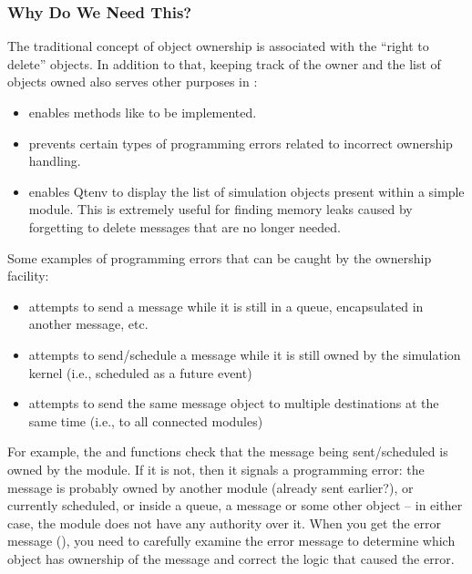 \subsubsection{Why Do We Need This?}
\label{sec:sim-lib:why-we-need-ownership}

The traditional concept of object ownership is associated with
the ``right to delete'' objects. In addition to that,
keeping track of the owner and the list of objects owned also
serves other purposes in {\opp}:

\begin{itemize}
    \item enables methods like  to be implemented.

    \item prevents certain types of programming errors related to incorrect
    ownership handling.

    \item enables Qtenv to display the list of simulation objects
    present within a simple module. This is extremely useful for finding
    memory leaks caused by forgetting to delete messages that are
    no longer needed.
\end{itemize}

Some examples of programming errors that can be caught
by the ownership facility:

\begin{itemize}
    \item attempts to send a message while it is still in a queue,
    encapsulated in another message, etc.

    \item attempts to send/schedule a message while it is still owned
    by the simulation kernel (i.e., scheduled as a future event)

    \item attempts to send the same message object to multiple
    destinations at the same time (i.e., to all connected modules)
\end{itemize}

For example, the  and  functions check
that the message being sent/scheduled is owned by the module.
If it is not, then it signals a programming error: the message is probably
owned by another module (already sent earlier?), or currently scheduled, or
inside a queue, a message or some other object -- in either case, the
module does not have any authority over it. When you get the error message
(), you need to carefully examine the error
message to determine which object has ownership of the message and correct
the logic that caused the error.

